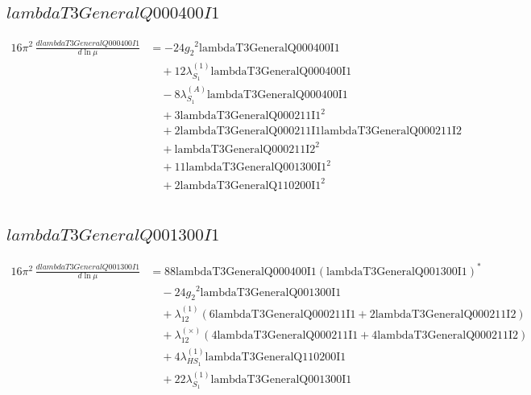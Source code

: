 \documentclass[10pt,a4paper]{article}
\begin{document}
\subsection*{$lambdaT3GeneralQ000400I1$}
\begin{align*}
16\pi^2\,\frac{d lambdaT3GeneralQ000400I1}{d\ln\mu} &=-24 {g_2}^2 \text{lambdaT3GeneralQ000400I1} \\
&\quad +12 {\lambda_{S_1}^{(1)}} \text{lambdaT3GeneralQ000400I1} \\
&\quad -8 {\lambda_{S_1}^{(A)}} \text{lambdaT3GeneralQ000400I1} \\
&\quad +3 \text{lambdaT3GeneralQ000211I1}^2 \\
&\quad +2 \text{lambdaT3GeneralQ000211I1} \text{lambdaT3GeneralQ000211I2} \\
&\quad +\text{lambdaT3GeneralQ000211I2}^2 \\
&\quad +11 \text{lambdaT3GeneralQ001300I1}^2 \\
&\quad +2 \text{lambdaT3GeneralQ110200I1}^2 \\
\end{align*}
\subsection*{$lambdaT3GeneralQ001300I1$}
\begin{align*}
16\pi^2\,\frac{d lambdaT3GeneralQ001300I1}{d\ln\mu} &=88 \text{lambdaT3GeneralQ000400I1} \left(\text{lambdaT3GeneralQ001300I1}\right)^{*} \\
&\quad -24 {g_2}^2 \text{lambdaT3GeneralQ001300I1} \\
&\quad +{\lambda_{12}^{(1)}} (6 \text{lambdaT3GeneralQ000211I1}+2 \text{lambdaT3GeneralQ000211I2}) \\
&\quad +{\lambda_{12}^{(\times)}} (4 \text{lambdaT3GeneralQ000211I1}+4 \text{lambdaT3GeneralQ000211I2}) \\
&\quad +4 {\lambda_{HS_1}^{(1)}} \text{lambdaT3GeneralQ110200I1} \\
&\quad +22 {\lambda_{S_1}^{(1)}} \text{lambdaT3GeneralQ001300I1} \\
\end{align*}
\end{document}
